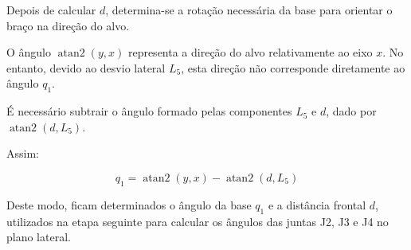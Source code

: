 Depois de calcular $d$, determina-se a rotação necessária da base para orientar o braço na direção do alvo.

O ângulo $\operatorname{atan2}(y,x)$ representa a direção do alvo relativamente ao eixo $x$. No entanto, devido ao desvio lateral $L_5$, esta direção não corresponde diretamente ao ângulo $q_1$.

É necessário subtrair o ângulo formado pelas componentes $L_5$ e $d$, dado por $\operatorname{atan2}(d,L_5)$.

Assim:

\begin{equation}
    \boxed{
    q_1=
    \operatorname{atan2}(y,x)
    -
    \operatorname{atan2}(d,L_5)
    }
    \label{eq:ik_q1}
\end{equation}

Deste modo, ficam determinados o ângulo da base $q_1$ e a distância frontal $d$, utilizados na etapa seguinte para calcular os ângulos das juntas J2, J3 e J4 no plano lateral.


